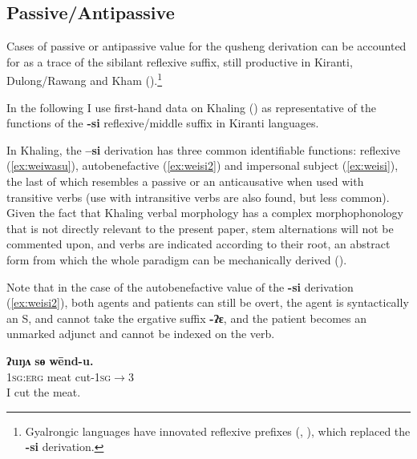 \documentclass[oneside,a4paper,11pt]{article}
\newcommand{\ipa}[1]{{\phon\textbf{\mbox{#1}}}}
\begin{document}

\subsection{Passive/Antipassive} \label{sec:passive}
Cases of passive or antipassive value for the qusheng derivation can be accounted for as a trace of the sibilant reflexive suffix, still productive in Kiranti, Dulong/Rawang and Kham (\citealt[320]{driem93agreement}).\footnote{Gyalrongic languages have innovated reflexive prefixes (\citealt{jacques10refl}, \citealt[89]{lai13affixale}), which replaced the \ipa{-si} derivation.} 

In the following I use first-hand data on Khaling (\citealt{jacques16si}) as representative of the functions of the \ipa{-si} reflexive/middle suffix in Kiranti languages.



In Khaling, the  \ipa{--si} derivation has three common identifiable functions: reflexive (\ref{ex:weiwasu}), autobenefactive (\ref{ex:weisi2}) and impersonal subject (\ref{ex:weisi}), the last of which resembles a passive or an anticausative when used with transitive verbs (use with intransitive verbs are also found, but less common). Given the fact that Khaling verbal morphology has a complex morphophonology that is not directly relevant to the present paper, stem alternations will not be commented upon, and verbs are indicated according to their root, an abstract form from which the whole paradigm can be mechanically derived (\citealt{jacques12khaling, jacques16si}).

Note that in the case of the autobenefactive value of the \ipa{-si} derivation (\ref{ex:weisi2}), both agents and patients can still be overt, the agent is syntactically an S, and cannot take the ergative suffix \ipa{-ʔɛ}, and the patient becomes an unmarked adjunct and cannot be indexed on the verb.
 
\begin{exe}
\ex \label{ex:wendu} 
\gll 
\ipa{ʔuŋʌ}  	\ipa{sɵ}  	\ipa{wēnd-u.}  \\
\textsc{1sg:erg} meat cut-\textsc{1sg$\rightarrow$3} \\
\glt I cut the meat.
\end{exe}
\end{document}
